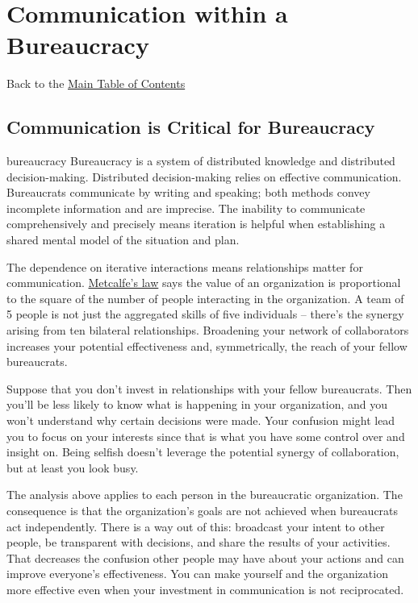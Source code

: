 \chapter{Communication within a Bureaucracy\label{sec:communication-within-bureaucracy}}
{\footnotesize Back to the \hyperref[sec:toc]{Main Table of Contents}}
\minitoc


\section{Communication is Critical for Bureaucracy}

\ifglossarysubstitutionworks
\Gls{bureaucracy} 
\else
Bureaucracy
\fi
{}
is a system of distributed knowledge and distributed decision-making. Distributed decision-making relies on effective communication. Bureaucrats communicate by writing and speaking; both methods convey incomplete information and are imprecise. The inability to communicate  comprehensively and precisely  means iteration is helpful when establishing a shared mental model of the situation and plan.


The dependence on iterative interactions means relationships matter for communication. 
\href{https://en.wikipedia.org/wiki/Metcalfe\%27s_law}{Metcalfe's law} 
says
the value of an organization is proportional to the square of the number of people interacting in the organization. A team of 5 people is not just the aggregated skills of five individuals -- there's the synergy arising from ten bilateral relationships. Broadening your network of collaborators increases your potential effectiveness and, symmetrically, the reach of your fellow bureaucrats. 

Suppose that you don't invest in relationships with your fellow bureaucrats. Then you'll be less likely to know what is happening in your organization, and you won't understand why certain decisions were made. Your confusion might lead you to focus on your interests since that is what you have some control over and insight on. Being selfish doesn't leverage the potential synergy of collaboration, but at least you look busy. 

The analysis above applies to each person in the bureaucratic organization.
The consequence is that the organization's goals are not achieved when bureaucrats act independently. 
There is a way out of this: broadcast your intent to other people, be transparent with decisions, and share the results of your activities. That decreases the confusion other people may have about your actions and can improve everyone's effectiveness. You can make yourself and the organization more effective even when your investment in communication is not reciprocated.


